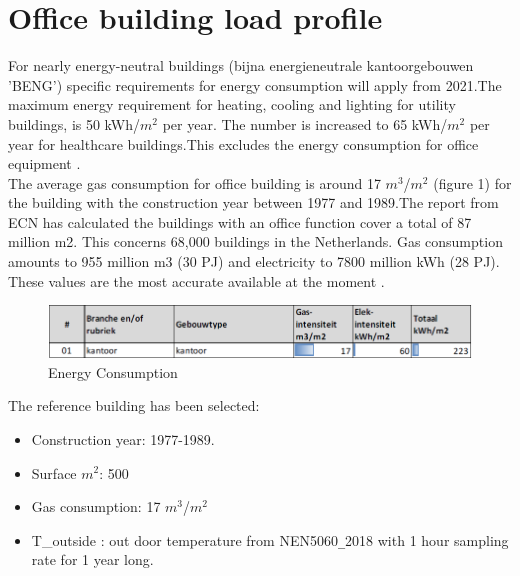\section{Office building load profile}

For nearly energy-neutral buildings (bijna energieneutrale kantoorgebouwen 'BENG') specific requirements for energy consumption will apply from 2021.The maximum energy requirement for heating, cooling and lighting for utility buildings, is 50 kWh/$m^2$ per year. The number is increased to 65 kWh/$m^2$ per year for healthcare buildings.This excludes the energy consumption for office equipment \cite{Benchmark1}.\\
The average gas consumption for office building is around 17 $m^3$/$m^2$ (figure 1) for the building with the construction year between 1977 and 1989.The report from ECN has calculated the buildings with an office function cover a total of 87 million m2. This concerns 68,000 buildings in the Netherlands. Gas consumption amounts to 955 million m3 (30 PJ) and electricity to 7800 million kWh (28 PJ). These values are the most accurate available at the moment \cite{Benchmark2, ECN}.

\begin{figure}[ht]
\centering
\includegraphics[width=1\columnwidth]{pictures/ECN.png}
\caption[Short title]{Energy Consumption}
\label{fig:consumption}
\end{figure}


The reference building has been selected:

\begin{itemize}
  \item Construction year: 1977-1989.
  \item Surface $m^2$: 500
  \item Gas consumption: 17 $m^3$/$m^2$
  \item T{\_outside} : out door temperature from NEN5060\texttt{\_}2018 with 1 hour sampling rate for 1 year long.
\end{itemize}
    
